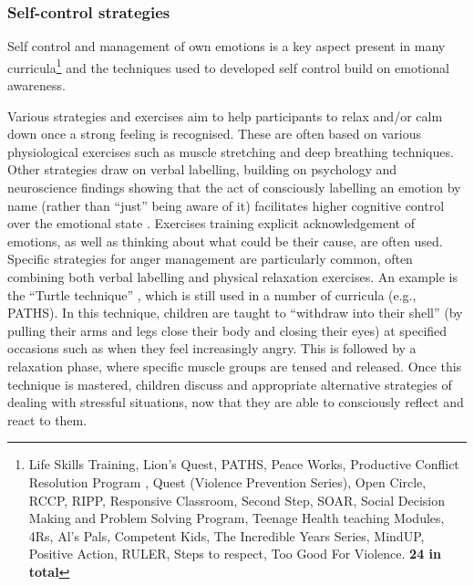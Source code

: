 \documentclass[prodmode,acmtochi]{acmsmall}
\newcommand{\GeraldineFIX}[1]{}
\begin{document}
\subsubsection{Self-control strategies}
Self control and management of own emotions is a key aspect present in many curricula\footnote{Life Skills Training, Lion's Quest, PATHS, Peace Works, Productive Conflict Resolution Program , Quest (Violence Prevention Series), Open Circle, RCCP, RIPP, Responsive Classroom, Second Step, SOAR, Social Decision Making and Problem Solving Program, Teenage Health teaching Modules, 4Rs, Al's Pals, Competent Kids, The Incredible Years Series, MindUP, Positive Action, RULER, Steps to respect, Too Good For Violence. {\bf 24 in total}} and the techniques used to developed self control build on emotional awareness.%

Various strategies and exercises aim to help participants to relax and/or calm down once a strong feeling is recognised. These are often based on various physiological exercises such as muscle stretching and deep breathing techniques. Other strategies draw on verbal labelling, building on psychology and neuroscience findings showing that the act of consciously labelling an emotion by name (rather than ``just'' being aware of it) facilitates higher cognitive control over the emotional state \cite{Greenberg2006,Reyes2012}. Exercises training explicit acknowledgement of emotions, as well as thinking about what could be their cause, are often used. 
Specific strategies for anger management are particularly common, often combining both verbal labelling and physical relaxation exercises. An example is the ``Turtle technique'' \cite{Robin1976}, which is still used in a number of curricula (e.g., PATHS).\GeraldineFIX{G: footnote with these named? P: Would be wuite an effort to list all -- I put in an eg instead}
In this technique, children are taught to ``withdraw into their shell'' (by pulling their arms and legs close their body and closing their eyes) at specified occasions such as when they feel increasingly angry. This is followed by a relaxation phase, where specific muscle groups are tensed and released. Once this technique is mastered, children discuss and appropriate alternative strategies of dealing with stressful situations, now that they are able to consciously reflect and react to them.
\end{document}
